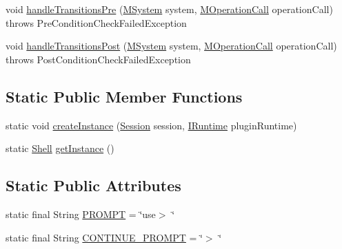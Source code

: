 \begin{DoxyCompactItemize}
\item 
void \hyperlink{classorg_1_1tzi_1_1use_1_1main_1_1shell_1_1_shell_a49b5901588cc27d58da8ed45500e7c69}{handle\-Transitions\-Pre} (\hyperlink{classorg_1_1tzi_1_1use_1_1uml_1_1sys_1_1_m_system}{M\-System} system, \hyperlink{classorg_1_1tzi_1_1use_1_1uml_1_1sys_1_1_m_operation_call}{M\-Operation\-Call} operation\-Call)  throws Pre\-Condition\-Check\-Failed\-Exception 
\item 
void \hyperlink{classorg_1_1tzi_1_1use_1_1main_1_1shell_1_1_shell_a82597a2d56482c31a6d24b46c05b9491}{handle\-Transitions\-Post} (\hyperlink{classorg_1_1tzi_1_1use_1_1uml_1_1sys_1_1_m_system}{M\-System} system, \hyperlink{classorg_1_1tzi_1_1use_1_1uml_1_1sys_1_1_m_operation_call}{M\-Operation\-Call} operation\-Call)  throws Post\-Condition\-Check\-Failed\-Exception 
\end{DoxyCompactItemize}
\subsection*{Static Public Member Functions}
\begin{DoxyCompactItemize}
\item 
static void \hyperlink{classorg_1_1tzi_1_1use_1_1main_1_1shell_1_1_shell_aaab1797c2e9b6ab2da82c01d111f2316}{create\-Instance} (\hyperlink{classorg_1_1tzi_1_1use_1_1main_1_1_session}{Session} session, \hyperlink{interfaceorg_1_1tzi_1_1use_1_1main_1_1runtime_1_1_i_runtime}{I\-Runtime} plugin\-Runtime)
\item 
static \hyperlink{classorg_1_1tzi_1_1use_1_1main_1_1shell_1_1_shell}{Shell} \hyperlink{classorg_1_1tzi_1_1use_1_1main_1_1shell_1_1_shell_a263f9cde66435c6ed03aaa13599f0ff4}{get\-Instance} ()
\end{DoxyCompactItemize}
\subsection*{Static Public Attributes}
\begin{DoxyCompactItemize}
\item 
static final String \hyperlink{classorg_1_1tzi_1_1use_1_1main_1_1shell_1_1_shell_a3e9bce62b3d565cb5b799a6260e2f890}{P\-R\-O\-M\-P\-T} = \char`\"{}use$>$ \char`\"{}
\item 
static final String \hyperlink{classorg_1_1tzi_1_1use_1_1main_1_1shell_1_1_shell_a1b6257172b3924635f76b33d74826367}{C\-O\-N\-T\-I\-N\-U\-E\-\_\-\-P\-R\-O\-M\-P\-T} = \char`\"{}$>$ \char`\"{}
\end{DoxyCompactItemize}


